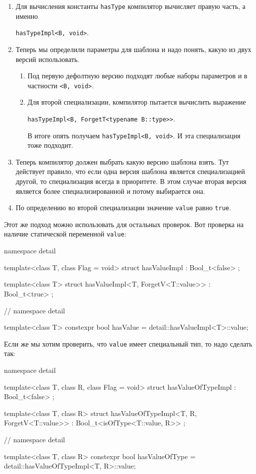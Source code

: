 \begin{enumerate}
\item Для вычисления константы \verb"hasType" компилятор вычисляет правую часть, а именно
\begin{center}
\verb"hasTypeImpl<B, void>".
\end{center}

\item Теперь мы определили параметры для шаблона и надо понять, какую из двух версий использовать.
\begin{enumerate}
\item Под первую дефолтную версию подходят любые наборы параметров и в частности \verb"<B, void>".

\item Для второй специализации, компилятор пытается вычислить выражение
\begin{center}
\verb"hasTypeImpl<B, ForgetT<typename B::type>>".
\end{center}

В итоге опять получаем \verb"hasTypeImpl<B, void>".
И эта специализация тоже подходит.
\end{enumerate}

\item Теперь компилятор должен выбрать какую версию шаблона взять.
Тут действует правило, что если одна версия шаблона является специализацией другой, то специализация всегда в приоритете.
В этом случае вторая версия является более специализированной и потому выбирается она.

\item По определению во второй специализации значение \verb"value" равно \verb"true".
\end{enumerate}
Этот же подход можно использовать для остальных проверок.
Вот проверка на наличие статической переменной \verb"value":
\begin{cppcode}
namespace detail {

template<class T, class Flag = void>
struct hasValueImpl : Bool_t<false> {};

template<class T>
struct hasValueImpl<T, ForgetV<T::value>> : Bool_t<true> {};
} // namespace detail

template<class T>
constexpr bool hasValue = detail::hasValueImpl<T>::value;
\end{cppcode}
Если же мы хотим проверить, что \verb"value" имеет специальный тип, то надо сделать так:
\begin{cppcode}
namespace detail {
template<class T, class R, class Flag = void>
struct hasValueOfTypeImpl : Bool_t<false> {};

template<class T, class R>
struct hasValueOfTypeImpl<T, R, ForgetV<T::value>> : Bool_t<isOfType<T::value, R>> {};
} // namespace detail

template<class T, class R>
constexpr bool hasValueOfType = detail::hasValueOfTypeImpl<T, R>::value;
\end{cppcode}
